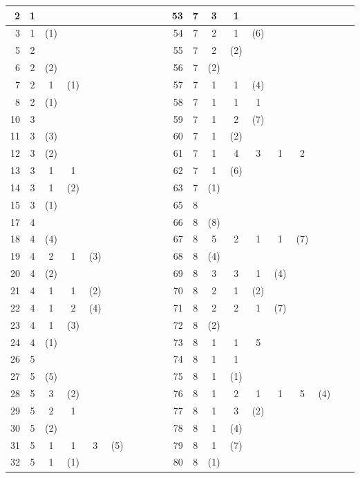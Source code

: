 \begin{figure}
\begin{center}\footnotesize \tabcolsep=3.5pt
\begin{tabular}{||r|*{9}{c}||r|*{9}{c}||}\hline
    2&1&&&&&&&& & 53&7&3&1&&&&&& \\ \hline
    3&1&(1)&&&&&&& & 54&7&2&1&(6)&&&&& \\ \hline
    5&2&&&&&&&& & 55&7&2&(2)&&&&&& \\ \hline
    6&2&(2)&&&&&&& & 56&7&(2)&&&&&&& \\ \hline
    7&2&1&(1)&&&&&& & 57&7&1&1&(4)&&&&& \\ \hline
    8&2&(1)&&&&&&& & 58&7&1&1&1&&&&& \\ \hline
    10&3&&&&&&&& & 59&7&1&2&(7)&&&&& \\ \hline
    11&3&(3)&&&&&&& & 60&7&1&(2)&&&&&& \\ \hline
    12&3&(2)&&&&&&& & 61&7&1&4&3&1&2&&& \\ \hline
    13&3&1&1&&&&&& & 62&7&1&(6)&&&&&& \\ \hline
    14&3&1&(2)&&&&&& & 63&7&(1)&&&&&&& \\ \hline
    15&3&(1)&&&&&&& & 65&8&&&&&&&& \\ \hline
    17&4&&&&&&&& & 66&8&(8)&&&&&&& \\ \hline
    18&4&(4)&&&&&&& & 67&8&5&2&1&1&(7)&&& \\ \hline
    19&4&2&1&(3)&&&&& & 68&8&(4)&&&&&&& \\ \hline
    20&4&(2)&&&&&&& & 69&8&3&3&1&(4)&&&& \\ \hline
    21&4&1&1&(2)&&&&& & 70&8&2&1&(2)&&&&& \\ \hline
    22&4&1&2&(4)&&&&& & 71&8&2&2&1&(7)&&&& \\ \hline
    23&4&1&(3)&&&&&& & 72&8&(2)&&&&&&& \\ \hline
    24&4&(1)&&&&&&& & 73&8&1&1&5&&&&& \\ \hline
    26&5&&&&&&&& & 74&8&1&1&&&&&& \\ \hline
    27&5&(5)&&&&&&& & 75&8&1&(1)&&&&&& \\ \hline
    28&5&3&(2)&&&&&& & 76&8&1&2&1&1&5&(4)&& \\ \hline
    29&5&2&1&&&&&& & 77&8&1&3&(2)&&&&& \\ \hline
    30&5&(2)&&&&&&& & 78&8&1&(4)&&&&&& \\ \hline
    31&5&1&1&3&(5)&&&& & 79&8&1&(7)&&&&&& \\ \hline
    32&5&1&(1)&&&&&& & 80&8&(1)&&&&&&& \\ \hline

\end{tabular}
\end{center}
\end{figure}
